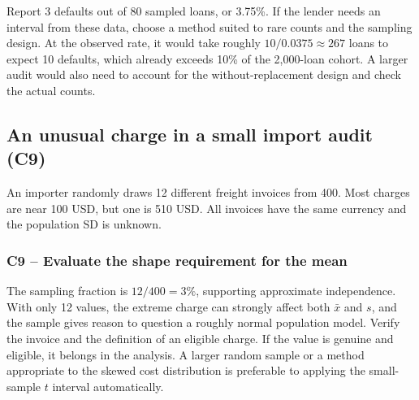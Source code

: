 	Report 3 defaults out of 80 sampled loans, or 3.75\%. If the lender needs an interval from these data, choose a method suited to rare counts and the sampling design. At the observed rate, it would take roughly $10/0.0375\approx267$ loans to expect 10 defaults, which already exceeds 10\% of the 2,000-loan cohort. A larger audit would also need to account for the without-replacement design and check the actual counts.


	\clearpage

	\subsection{An unusual charge in a small import audit (C9)}
	\label{prob:c9-3}

	An importer randomly draws 12 different freight invoices from 400. Most charges are near 100 USD, but one is 510 USD. All invoices have the same currency and the population SD is unknown.


	\label{sol:c9-3-a}
	\subsubsection*{C9 -- Evaluate the shape requirement for the mean}

	The sampling fraction is $12/400=3\%$, supporting approximate independence. With only 12 values, the extreme charge can strongly affect both $\bar x$ and $s$, and the sample gives reason to question a roughly normal population model. Verify the invoice and the definition of an eligible charge. If the value is genuine and eligible, it belongs in the analysis. A larger random sample or a method appropriate to the skewed cost distribution is preferable to applying the small-sample $t$ interval automatically.

